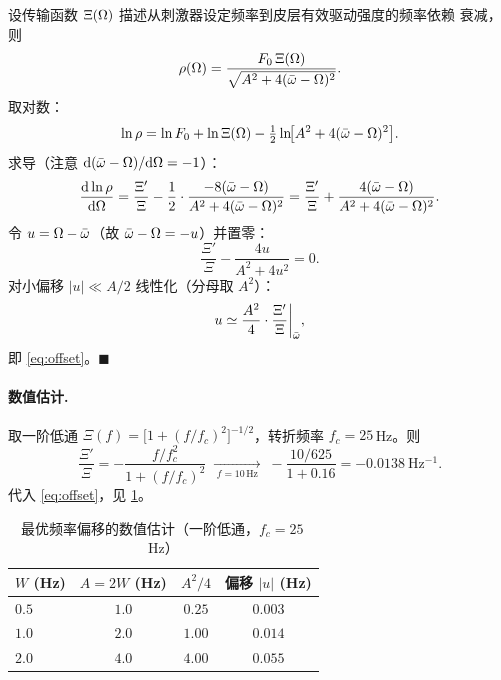 设传输函数 $\Xi(\Omega)$ 描述从刺激器设定频率到皮层有效驱动强度的频率依赖
衰减，则
%
\begin{equation}
\rho(\Omega)=\frac{F_{0}\,\Xi(\Omega)}{\sqrt{A^{2}+4(\bar{\omega}-\Omega)^{2}}} .
\end{equation}
%
取对数：
%
\begin{equation}
\ln\rho=\ln F_{0}+\ln\Xi(\Omega)
-\tfrac12\ln\!\bigl[A^{2}+4(\bar{\omega}-\Omega)^{2}\bigr].
\end{equation}
%
求导（注意 $\mathrm{d}(\bar{\omega}-\Omega)/\mathrm{d}\Omega=-1$）：
%
\begin{equation}
\frac{\mathrm{d}\ln\rho}{\mathrm{d}\Omega}
=\frac{\Xi'}{\Xi}
-\frac12\cdot\frac{-8(\bar{\omega}-\Omega)}{A^{2}+4(\bar{\omega}-\Omega)^{2}}
=\frac{\Xi'}{\Xi}+\frac{4(\bar{\omega}-\Omega)}{A^{2}+4(\bar{\omega}-\Omega)^{2}} .
\end{equation}
%
令 $u=\Omega-\bar{\omega}$（故 $\bar{\omega}-\Omega=-u$）并置零：
%
\begin{equation}
\frac{\Xi'}{\Xi}-\frac{4u}{A^{2}+4u^{2}}=0 .
\end{equation}
%
对小偏移 $|u|\ll A/2$ 线性化（分母取 $A^{2}$）：
%
\begin{equation}
u\simeq\frac{A^{2}}{4}\cdot\frac{\Xi'}{\Xi}\bigg|_{\bar{\omega}},
\end{equation}
%
即 \cref{eq:offset}。\hfill$\blacksquare$

\paragraph{数值估计.}
取一阶低通 $\Xi(f)=\bigl[1+(f/f_{c})^{2}\bigr]^{-1/2}$，转折频率
$f_{c}=25\,$Hz。则
%
\begin{equation}
\frac{\Xi'}{\Xi}=-\frac{f/f_{c}^{2}}{1+(f/f_{c})^{2}}
\;\xrightarrow[\;f=10\,\mathrm{Hz}\;]{}\;
-\frac{10/625}{1+0.16}=-0.0138\ \mathrm{Hz^{-1}} .
\end{equation}
%
代入 \cref{eq:offset}，见 \cref{tab:offset}。

\begin{table}[htbp]
\centering
\caption{最优频率偏移的数值估计（一阶低通，$f_c=25\,$Hz）}
\label{tab:offset}
\small
\begin{tabular}{@{}lccc@{}}
\toprule
$W$ (Hz) & $A=2W$ (Hz) & $A^{2}/4$ & 偏移 $|u|$ (Hz) \\
\midrule
$0.5$ & $1.0$ & $0.25$ & $0.003$ \\
$1.0$ & $2.0$ & $1.00$ & $0.014$ \\
$2.0$ & $4.0$ & $4.00$ & $0.055$ \\
\bottomrule
\end{tabular}
\end{table}

